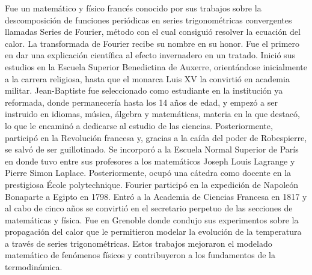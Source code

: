 \begin{parchment}
{ Fue un matemático y físico francés conocido por sus trabajos sobre la descomposición de funciones periódicas en series trigonométricas convergentes llamadas Series de Fourier, método con el cual consiguió resolver la ecuación del calor. La transformada de Fourier recibe su nombre en su honor. Fue el primero en dar una explicación científica al efecto invernadero en un tratado.
Inició sus estudios en la Escuela Superior Benedictina de Auxerre, orientándose inicialmente a la carrera religiosa, hasta que el monarca Luis XV la convirtió en academia militar. Jean-Baptiste fue seleccionado como estudiante en la institución ya reformada, donde permanecería hasta los 14 años de edad, y empezó a ser instruido en idiomas, música, álgebra y matemáticas, materia en la que destacó, lo que le encaminó a dedicarse al estudio de las ciencias.
Posteriormente, participó en la Revolución francesa y, gracias a la caída del poder de Robespierre, se salvó de ser guillotinado. Se incorporó a la Escuela Normal Superior de París en donde tuvo entre sus profesores a los matemáticos Joseph Louis Lagrange y Pierre Simon Laplace. Posteriormente, ocupó una cátedra como docente en la prestigiosa École polytechnique.
Fourier participó en la expedición de Napoleón Bonaparte a Egipto en 1798. 
Entró a la Academia de Ciencias Francesa en 1817 y al cabo de cinco años se convirtió en el secretario perpetuo de las secciones de matemáticas y física.
Fue en Grenoble donde condujo sus experimentos sobre la propagación del calor que le permitieron modelar la evolución de la temperatura a través de series trigonométricas. Estos trabajos mejoraron el modelado matemático de fenómenos físicos y contribuyeron a los fundamentos de la termodinámica.
}
\end{parchment}
